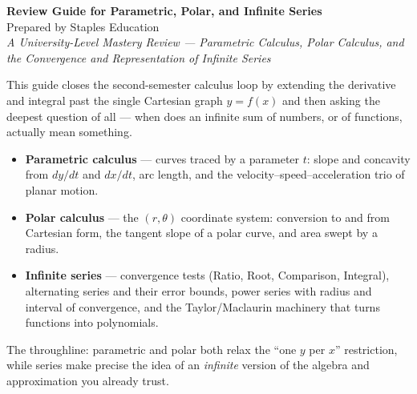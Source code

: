 \documentclass[11pt]{article}
\begin{document}
\begin{center}
    {\LARGE \bfseries Review Guide for Parametric, Polar, and Infinite Series}\\[6pt]
    {\large Prepared by Staples Education}\\[4pt]
    {\itshape A University-Level Mastery Review --- Parametric Calculus,
    Polar Calculus, and the Convergence and Representation of Infinite Series}
\end{center}

\vspace{0.4em}
\tableofcontents
\vspace{0.4em}

\begin{topicsbox}
This guide closes the second-semester calculus loop by extending the derivative
and integral past the single Cartesian graph $y=f(x)$ and then asking the deepest
question of all --- when does an infinite sum of numbers, or of functions, actually
mean something.
\begin{itemize}[leftmargin=1.4em, itemsep=3pt]
    \item \textbf{Parametric calculus} --- curves traced by a parameter $t$:
          slope and concavity from $dy/dt$ and $dx/dt$, arc length, and the
          velocity--speed--acceleration trio of planar motion.
    \item \textbf{Polar calculus} --- the $(r,\theta)$ coordinate system:
          conversion to and from Cartesian form, the tangent slope of a polar
          curve, and area swept by a radius.
    \item \textbf{Infinite series} --- convergence tests (Ratio, Root,
          Comparison, Integral), alternating series and their error bounds,
          power series with radius and interval of convergence, and the
          Taylor/Maclaurin machinery that turns functions into polynomials.
\end{itemize}
The throughline: parametric and polar both relax the ``one $y$ per $x$''
restriction, while series make precise the idea of an \emph{infinite} version of
the algebra and approximation you already trust.
\end{topicsbox}
\end{document}
